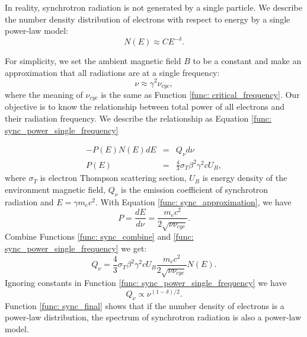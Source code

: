 \documentclass[a4paper, 12pt]{report}
\begin{document}
      In reality, synchrotron radiation is not generated by a single particle. We 
      describe the number density distribution of electrons with respect to energy by a 
      single power-law model:
      \begin{equation}
        \label{func: sync_number_density}
        N\left(E\right) \approx C E^{-\delta} .
      \end{equation}
    
      For simplicity, we set the ambient magnetic field $B$ to be a constant and make an 
      approximation that all radiations are at a single frequency:
      \begin{equation}
        \label{func: sync_approximation}
        \nu \approx \gamma^2 \nu_{cyc} ,
      \end{equation}
      where the meaning of $\nu_{cyc}$ is the same as Function 
      \ref{func: critical_frequency}. Our objective is to know the relationship between 
      total power of all electrons and their radiation frequency. We describe the 
      relationship as Equation \ref{func: sync_power_single_frequency}
        
      \begin{eqnarray}
        \label{func: sync_power_single_frequency}
        -P\left(E\right)N\left(E\right)dE &=& Q_{\nu} d\nu\\
        P\left(E\right) &=& \frac{4}{3} \sigma_{T} \beta^2 \gamma^2 c U_B ,
      \end{eqnarray} 
      where $\sigma_{T}$ is electron Thompson scattering section, $U_B$ is energy 
      density of the environment magnetic field, $Q_{\nu}$ is the emission coefficient 
      of synchrotron radiation and $E=\gamma m_e c^2$. With Equation 
      \ref{func: sync_approximation}, we have
      \begin{equation}
        \label{func: sync_combine}
        P = \frac{dE}{d\nu} = \frac{m_e c^2}{2\sqrt{\nu \nu_{cyc}}} .
      \end{equation}
      Combine Functions \ref{func: sync_combine} and 
      \ref{func: sync_power_single_frequency} we get:
      \begin{equation}
        Q_{\nu} = \frac{4}{3} \sigma_{T} \beta^2 \gamma^2 c U_B \frac{m_e c^2}{2\sqrt{\nu \nu_{cyc}}} N\left(E\right) .
      \end{equation}
      Ignoring constants in Function \ref{func: sync_power_single_frequency} we have 
      \begin{equation}
        \label{func: sync_final}
        Q_{\nu} \propto \nu^{(1-\delta)/2} .
      \end{equation}
      Function \ref{func: sync_final} shows that if the number density of electrons is 
      a power-law distribution, the spectrum of synchrotron radiation is also a 
      power-law model.  
            
\end{document}

